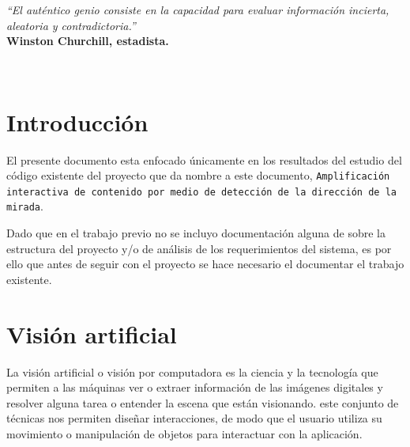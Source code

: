 \documentclass[12pt]{article} %
\begin{document}

\tableofcontents %

\newpage %
\setcounter{page}{1}
	
	\begin{minipage}{0.5\textwidth}
		\begin{flushleft} \large
		\scriptsize	\textsl{\large “El auténtico genio consiste en la capacidad para evaluar información incierta, aleatoria y contradictoria.”}\\
		\scriptsize \textbf{Winston Churchill, estadista.}
		\end{flushleft}
	\end{minipage}\\[4cm]
			
		 
\newpage		 
     

\section*{Introducción}

	El presente documento esta enfocado únicamente en los resultados del estudio del código existente del proyecto que da nombre 
    a este documento, \texttt{Amplificación interactiva de contenido por medio de detección de la dirección de la mirada}.
    
    Dado que en el trabajo previo no se incluyo documentación alguna de sobre la estructura del proyecto y/o de análisis de los requerimientos
    del sistema, es por ello que antes de seguir con el proyecto se hace necesario el documentar el trabajo existente.

\section{Visión artificial \label{vision_artificial}}
	La visión artificial o visión por computadora es la ciencia y la tecnología que permiten a las máquinas ver o extraer información de las 
    imágenes digitales y resolver alguna tarea o entender la escena que están visionando.
    este conjunto de técnicas nos permiten diseñar interacciones, de modo que el usuario utiliza su movimiento o manipulación de objetos para 
    interactuar con la aplicación.
    
\end{document}
